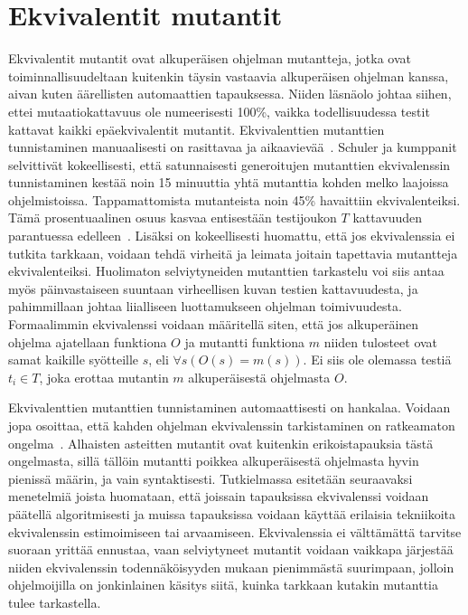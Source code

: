 \documentclass[finnish]{tktltiki2}
\begin{document}
\section{Ekvivalentit mutantit}
Ekvivalentit mutantit ovat alkuperäisen ohjelman mutantteja, jotka ovat toiminnallisuudeltaan kuitenkin täysin vastaavia alkuperäisen ohjelman kanssa, aivan kuten äärellisten automaattien tapauksessa. Niiden läsnäolo johtaa siihen, ettei mutaatiokattavuus ole numeerisesti 100\%, vaikka todellisuudessa testit kattavat kaikki epäekvivalentit mutantit. Ekvivalenttien mutanttien tunnistaminen manuaalisesti on rasittavaa ja aikaavievää~\cite{GrunSZ09}. Schuler ja kumppanit selvittivät kokeellisesti, että satunnaisesti generoitujen mutanttien ekvivalenssin tunnistaminen kestää noin 15 minuuttia yhtä mutanttia kohden melko laajoissa ohjelmistoissa. Tappamattomista mutanteista noin 45\% havaittiin ekvivalenteiksi. Tämä prosentuaalinen osuus kasvaa entisestään testijoukon $T$ kattavuuden parantuessa edelleen~\cite{SchulerZ10}. Lisäksi on kokeellisesti huomattu, että jos ekvivalenssia ei tutkita tarkkaan, voidaan tehdä virheitä ja leimata joitain tapettavia mutantteja ekvivalenteiksi. Huolimaton selviytyneiden mutanttien tarkastelu voi siis antaa myös päinvastaiseen suuntaan virheellisen kuvan testien kattavuudesta, ja pahimmillaan johtaa liialliseen luottamukseen ohjelman toimivuudesta. Formaalimmin ekvivalenssi voidaan määritellä siten, että jos alkuperäinen ohjelma ajatellaan funktiona $O$ ja mutantti funktiona $m$ niiden tulosteet ovat samat kaikille syötteille $s$, eli $\forall s(O(s) = m(s))$. Ei siis ole olemassa testiä $t_i \in T$, joka erottaa mutantin $m$ alkuperäisestä ohjelmasta $O$.

Ekvivalenttien mutanttien tunnistaminen automaattisesti on hankalaa. Voidaan jopa osoittaa, että kahden ohjelman ekvivalenssin tarkistaminen on ratkeamaton ongelma~\cite{Goldblatt}. Alhaisten asteitten mutantit ovat kuitenkin erikoistapauksia tästä ongelmasta, sillä tällöin mutantti poikkea alkuperäisestä ohjelmasta hyvin pienissä määrin, ja vain syntaktisesti. Tutkielmassa esitetään seuraavaksi menetelmiä joista huomataan, että joissain tapauksissa ekvivalenssi voidaan päätellä algoritmisesti ja muissa tapauksissa voidaan käyttää erilaisia tekniikoita ekvivalenssin estimoimiseen tai arvaamiseen. Ekvivalenssia ei välttämättä tarvitse suoraan yrittää ennustaa, vaan selviytyneet mutantit voidaan vaikkapa järjestää niiden ekvivalenssin todennäköisyyden mukaan pienimmästä suurimpaan, jolloin ohjelmoijilla on jonkinlainen käsitys siitä, kuinka tarkkaan kutakin mutanttia tulee tarkastella.
\end{document}
